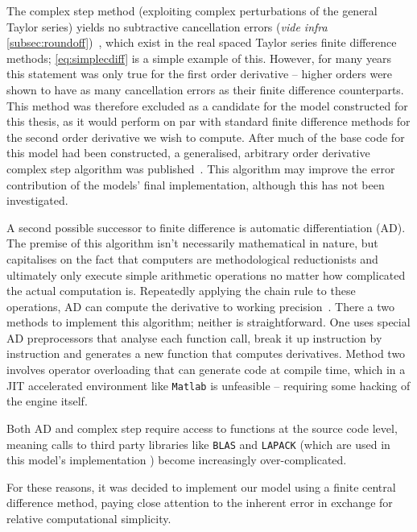The complex step method (exploiting complex perturbations of the general Taylor series) yields no subtractive cancellation errors (\emph{vide infra} \cref{subsec:roundoff})~\cite{Squire1998}, which exist in the real spaced Taylor series finite difference methods; \cref{eq:simplecdiff} is a simple example of this.
However, for many years this statement was only true for the first order derivative -- higher orders were shown to have as many cancellation errors as their finite difference counterparts.
This method was therefore excluded as a candidate for the model constructed for this thesis, as it would perform on par with standard finite difference methods for the second order derivative we wish to compute.
After much of the base code for this model had been constructed, a generalised, arbitrary order derivative complex step algorithm was published~\cite{Lantoine2012}.
This algorithm may improve the error contribution of the models' final implementation, although this has not been investigated.

A second possible successor to finite difference is automatic differentiation (AD).
The premise of this algorithm isn't necessarily mathematical in nature, but capitalises on the fact that computers are methodological reductionists and ultimately only execute simple arithmetic operations no matter how complicated the actual computation is.
Repeatedly applying the chain rule to these operations, AD can compute the derivative to working precision~\cite{Kedem1980}.
There a two methods to implement this algorithm; neither is straightforward.
One uses special AD preprocessors that analyse each function call, break it up instruction by instruction and generates a new function that computes derivatives.
Method two involves operator overloading that can generate code at compile time, which in a JIT accelerated environment like \texttt{Matlab} is unfeasible -- requiring some hacking of the engine itself.

Both AD and complex step require access to functions at the source code level, meaning calls to third party libraries like \texttt{BLAS} and \texttt{LAPACK} (which are used in this model's implementation ) become increasingly over-complicated.

For these reasons, it was decided to implement our model using a finite central difference method, paying close attention to the inherent error in exchange for relative computational simplicity.

